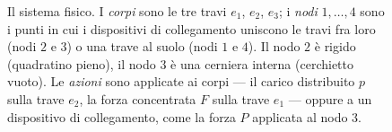 \begin{figure}[htbp]
\begin{tikzpicture}
	\end{tikzpicture}
	\caption{Il sistema fisico. I \emph{corpi} sono le tre
		travi $e_1$, $e_2$, $e_3$; i \emph{nodi} $1,\dots,4$
		sono i punti in cui i dispositivi di collegamento
		uniscono le travi fra loro (nodi $2$ e $3$) o una trave
		al suolo (nodi $1$ e $4$). Il nodo $2$ è rigido
		(quadratino pieno), il nodo $3$ è una cerniera interna
		(cerchietto vuoto). Le \emph{azioni} sono applicate ai
		corpi --- il carico distribuito $p$ sulla trave $e_2$,
		la forza concentrata $F$ sulla trave $e_1$ --- oppure
		a un dispositivo di collegamento, come la forza $P$
		applicata al nodo $3$.}
	\label{fig:sistema_fisico}
\end{figure}
